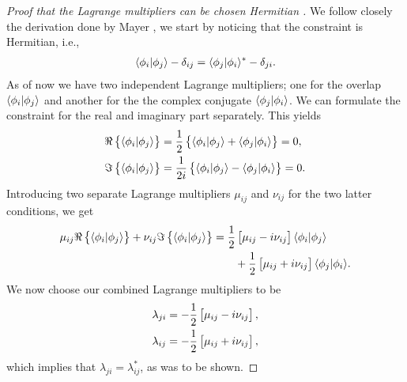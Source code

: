        \begin{proof}[%
                Proof that the Lagrange multipliers can be chosen Hermitian%
            ]
            We follow closely the derivation done by Mayer
            \cite{mayer2003simple}, we start by noticing that the constraint is
            Hermitian, i.e.,
            \begin{align}
                \langle \phi_i | \phi_j \rangle - \delta_{ij}
                = \langle \phi_j | \phi_i \rangle^{*} - \delta_{ji}.
            \end{align}
            As of now we have two independent Lagrange multipliers; one for the
            overlap $\langle \phi_i | \phi_j \rangle$ and another for the the complex
            conjugate $\langle \phi_j | \phi_i \rangle$.
            We can formulate the constraint for the real and imaginary part
            separately.
            This yields
            \begin{align}
                \Re\left\{ 
                    \langle \phi_i | \phi_j \rangle
                 \right\}
                &=
                \frac{1}{2}\left\{ 
                    \langle \phi_i | \phi_j \rangle
                    + \langle \phi_j | \phi_i \rangle
                 \right\}
                = 0,
                \\
                \Im\left\{ 
                    \langle \phi_i | \phi_j \rangle
                 \right\}
                &=
                \frac{1}{2i}\left\{ 
                    \langle \phi_i | \phi_j \rangle
                    - \langle \phi_j | \phi_i \rangle
                 \right\}
                = 0.
            \end{align}
            Introducing two separate Lagrange multipliers $\mu_{ij}$ and
            $\nu_{ij}$ for the two latter conditions, we get
            \begin{align}
                \mu_{ij}\Re\left\{ 
                    \langle \phi_i | \phi_j \rangle
                 \right\}
                + \nu_{ij}\Im\left\{ 
                    \langle \phi_i | \phi_j \rangle
                 \right\}
                &=
                \frac{1}{2}\left[ 
                    \mu_{ij} - i\nu_{ij}
                 \right]
                \langle \phi_i | \phi_j \rangle
                \nonumber
                \\
                &\qquad
                + \frac{1}{2}\left[ 
                    \mu_{ij} + i\nu_{ij}
                 \right]
                \langle \phi_j | \phi_i \rangle.
            \end{align}
            We now choose our combined Lagrange multipliers to be
            \begin{align}
                \lambda_{ji} &=
                -\frac{1}{2}\left[ 
                    \mu_{ij} - i\nu_{ij}
                 \right], \\
                \lambda_{ij} &=
                -\frac{1}{2}\left[ 
                    \mu_{ij} + i\nu_{ij}
                 \right],
            \end{align}
            which implies that $\lambda_{ji} = \lambda_{ij}^{*}$, as was to be
            shown.
        \end{proof}
